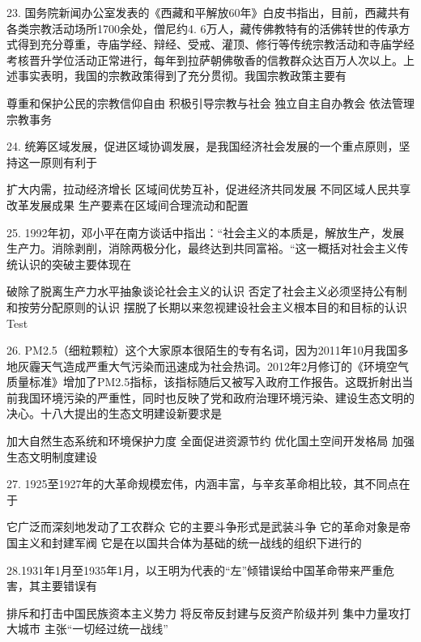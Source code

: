 23. 国务院新闻办公室发表的《西藏和平解放60年》白皮书指出，目前，西藏共有各类宗教活动场所1700余处，僧尼约4. 6万人，藏传佛教特有的活佛转世的传承方式得到充分尊重，寺庙学经、辩经、受戒、灌顶、修行等传统宗教活动和寺庙学经考核晋升学位活动正常进行，每年到拉萨朝佛敬香的信教群众达百万人次以上。上述事实表明，我国的宗教政策得到了充分贯彻。我国宗教政策主要有
\begin{choices}
	 尊重和保护公民的宗教信仰自由
	 积极引导宗教与社会
	 独立自主自办教会
	 依法管理宗教事务
\end{choices}
24. 统筹区域发展，促进区域协调发展，是我国经济社会发展的一个重点原则，坚持这一原则有利于
\begin{choices}
	 扩大内需，拉动经济增长
	 区域间优势互补，促进经济共同发展
	 不同区域人民共享改革发展成果
	 生产要素在区域间合理流动和配置
\end{choices}
25. 1992年初，邓小平在南方谈话中指出：“社会主义的本质是，解放生产，发展生产力。消除剥削，消除两极分化，最终达到共同富裕。“这一概括对社会主义传统认识的突破主要体现在
\begin{choices}
	 破除了脱离生产力水平抽象谈论社会主义的认识
	 否定了社会主义必须坚持公有制和按劳分配原则的认识
	 摆脱了长期以来忽视建设社会主义根本目的和目标的认识
	 Test
\end{choices}
26. PM2.5（细粒颗粒）这个大家原本很陌生的专有名词，因为2011年10月我国多地灰霾天气造成严重大气污染而迅速成为社会热词。2012年2月修订的《环境空气质量标准》增加了PM2.5指标，该指标随后又被写入政府工作报告。这既折射出当前我国环境污染的严重性，同时也反映了党和政府治理环境污染、建设生态文明的决心。十八大提出的生态文明建设新要求是
\begin{choices}
	 加大自然生态系统和环境保护力度
	 全面促进资源节约
	 优化国土空间开发格局
	 加强生态文明制度建设
\end{choices}
27. 1925至1927年的大革命规模宏伟，内涵丰富，与辛亥革命相比较，其不同点在于
\begin{choices}
	 它广泛而深刻地发动了工农群众
	 它的主要斗争形式是武装斗争
	 它的革命对象是帝国主义和封建军阀
	 它是在以国共合体为基础的统一战线的组织下进行的
\end{choices}
28.1931年1月至1935年1月，以王明为代表的“左”倾错误给中国革命带来严重危害，其主要错误有
\begin{choices}
	 排斥和打击中国民族资本主义势力
	 将反帝反封建与反资产阶级并列
	 集中力量攻打大城市
	 主张“一切经过统一战线”
\end{choices}
